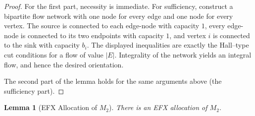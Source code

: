 \documentclass{article}
\newtheorem{lemma}{Lemma}
\theoremstyle{definition}
\begin{document}
\begin{proof}
For the first part, necessity is immediate.  For sufficiency, construct a bipartite flow network
with one node for every edge and one node for every vertex.  The source is
connected to each edge-node with capacity $1$, every edge-node is connected
to its two endpoints with capacity $1$, and vertex $i$ is connected to the
sink with capacity $b_i$.  The displayed inequalities are exactly the
Hall--type cut conditions for a flow of value $|E|$.  Integrality of the
network yields an integral flow, and hence the desired orientation.

The second part of the lemma holds for the same arguments above (the sufficiency part).
\end{proof}

\begin{lemma}[EFX Allocation of $M_2$]\label{lem:M2}
There is an EFX allocation of $M_2$.
\end{lemma}
\end{document}
